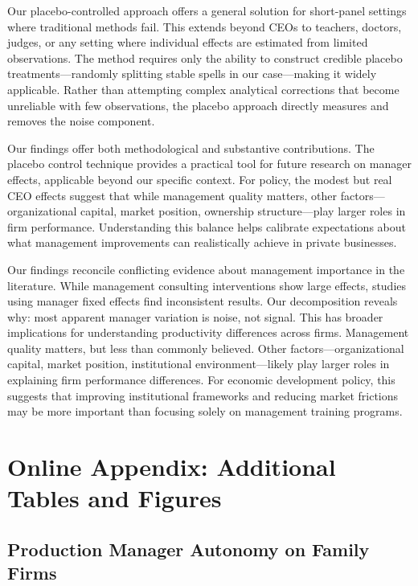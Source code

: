 \documentclass[11pt,a4paper]{article}
\begin{document}
Our placebo-controlled approach offers a general solution for short-panel settings where traditional methods fail. This extends beyond CEOs to teachers, doctors, judges, or any setting where individual effects are estimated from limited observations. The method requires only the ability to construct credible placebo treatments—randomly splitting stable spells in our case—making it widely applicable. Rather than attempting complex analytical corrections that become unreliable with few observations, the placebo approach directly measures and removes the noise component.

Our findings offer both methodological and substantive contributions. The placebo control technique provides a practical tool for future research on manager effects, applicable beyond our specific context. For policy, the modest but real CEO effects suggest that while management quality matters, other factors—organizational capital, market position, ownership structure—play larger roles in firm performance. Understanding this balance helps calibrate expectations about what management improvements can realistically achieve in private businesses.

Our findings reconcile conflicting evidence about management importance in the literature. While management consulting interventions show large effects, studies using manager fixed effects find inconsistent results. Our decomposition reveals why: most apparent manager variation is noise, not signal. This has broader implications for understanding productivity differences across firms. Management quality matters, but less than commonly believed. Other factors—organizational capital, market position, institutional environment—likely play larger roles in explaining firm performance differences. For economic development policy, this suggests that improving institutional frameworks and reducing market frictions may be more important than focusing solely on management training programs.




\appendix
\section{Online Appendix: Additional Tables and Figures}
\renewcommand{\thefigure}{A\arabic{figure}}
\renewcommand{\thetable}{A\arabic{table}}
\setcounter{figure}{0}
\setcounter{table}{0}

\subsection{Production Manager Autonomy on Family Firms}
\end{document}
